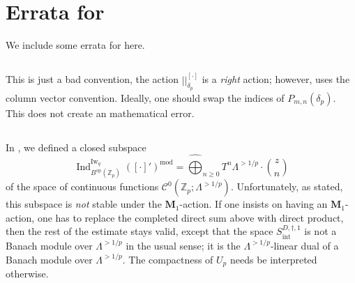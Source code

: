 \documentclass[12pt]{amsart}
\theoremstyle{definition}
\numberwithin{equation}{subsection}
\def\calC{\mathcal{C}}
\def\ZZ{\mathbb{Z}}
\def\bfM{\mathbf{M}}
\newcommand{\op}{\mathrm{op}}
\newcommand{\Iw}{\mathrm{Iw}}
\DeclareMathOperator{\Ind}{Ind}
\begin{document}
\section{Errata for \cite{liu-wan-xiao}}
We include some errata for \cite{liu-wan-xiao} here.

\subsection{\cite[Proposition~3.4]{liu-wan-xiao}}
This is just a bad convention, the action $||_{\delta_p}^{[\cdot]}$ is a \emph{right} action; however, \cite[Proposition~3.4]{liu-wan-xiao} uses the column vector convention.  Ideally, one should swap the indices of $P_{m,n}(\delta_p)$. This does not create an mathematical error.

\subsection{\cite[\S\,5.4]{liu-wan-xiao}} 
\label{ASS:errata integral model}
In \cite[(5.4.1)]{liu-wan-xiao}, we defined a closed subspace
$$
\Ind_{B^\op(\ZZ_p)}^{\Iw_q}([\cdot]')^{\mathrm{mod}} = \widehat{\bigoplus}_{n \geq 0} T^n \Lambda^{>1/p}\cdot \binom zn
$$
of the space of continuous functions $\calC^0(\ZZ_p; \Lambda^{>1/p})$.
Unfortunately, as stated, this subspace is \emph{not} stable under the $\bfM_1$-action. If one insists on having an $\bfM_1$-action, one has to replace the completed direct sum above with direct product, then the rest of the estimate stays valid, except that the space $S_{\mathrm{int}}^{D, \dagger, 1}$ is not a Banach module over $\Lambda^{>1/p}$ in the usual sense; it is the $\Lambda^{>1/p}$-linear dual of a Banach module over $\Lambda^{>1/p}$. The compactness of $U_p$ needs be interpreted otherwise.
\end{document}
